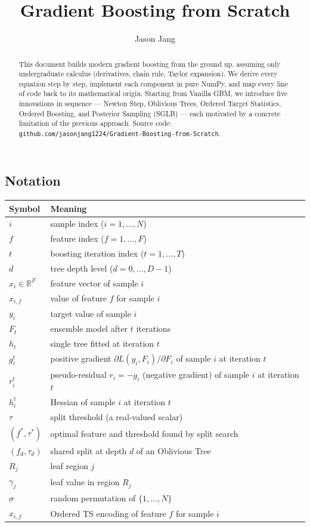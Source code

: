\documentclass[11pt, a4paper]{article}
\title{\textbf{Gradient Boosting from Scratch} \\[6pt]
       }
\author{Jason Jang}
\date{}
\begin{document}
\maketitle

\begin{abstract}
This document builds modern gradient boosting from the ground up, assuming only
undergraduate calculus (derivatives, chain rule, Taylor expansion).
We derive every equation step by step, implement each component in
pure NumPy, and map every line of code back to its mathematical origin.
Starting from Vanilla GBM, we introduce five innovations in sequence ---
Newton Step, Oblivious Trees, Ordered Target Statistics, Ordered Boosting,
and Posterior Sampling (SGLB) --- each motivated by a concrete limitation
of the previous approach.
Source code: \texttt{github.com/jasonjang1224/Gradient-Boosting-from-Scratch}.
\end{abstract}

\subsection*{Notation}

\begin{center}
\begin{tabular}{ll}
\toprule
\textbf{Symbol} & \textbf{Meaning} \\
\midrule
$i$ & sample index ($i = 1,\ldots,N$) \\
$f$ & feature index ($f = 1,\ldots,F$) \\
$t$ & boosting iteration index ($t = 1,\ldots,T$) \\
$d$ & tree depth level ($d = 0,\ldots,D-1$) \\
$x_i \in \mathbb{R}^F$ & feature vector of sample $i$ \\
$x_{i,f}$ & value of feature $f$ for sample $i$ \\
$y_i$ & target value of sample $i$ \\
$F_t$ & ensemble model after $t$ iterations \\
$h_t$ & single tree fitted at iteration $t$ \\
$g_i^t$ & positive gradient $\partial L(y_i,F_i)/\partial F_i$ of sample $i$ at iteration $t$ \\
$r_i^t$ & pseudo-residual $r_i = -g_i$ (negative gradient) of sample $i$ at iteration $t$ \\
$h_i^t$ & Hessian of sample $i$ at iteration $t$ \\
$\tau$ & split threshold (a real-valued scalar) \\
$(f^*, \tau^*)$ & optimal feature and threshold found by split search \\
$(f_d, \tau_d)$ & shared split at depth $d$ of an Oblivious Tree \\
$R_j$ & leaf region $j$ \\
$\gamma_j$ & leaf value in region $R_j$ \\
$\sigma$ & random permutation of $\{1,\ldots,N\}$ \\
$\hat{x}_{i,f}$ & Ordered TS encoding of feature $f$ for sample $i$ \\
\bottomrule
\end{tabular}
\end{center}
\end{document}
